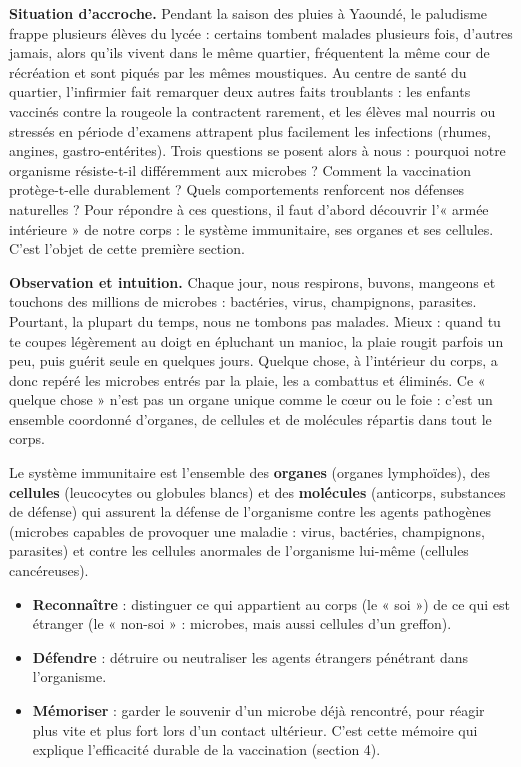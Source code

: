 \documentclass[11pt]{article}
\newcommand{\cle}[1]{{\popxbold\color{popdark}#1}}
\newcounter{popsec}
\newcounter{popsub}
\newcommand{\courssub}[1]{%
  \stepcounter{popsub}%
  \par\vspace{9pt}\noindent{\popxbold\fontsize{11.5}{13}\selectfont\color{popink}{\color{poporange}\thepopsec.\thepopsub}\hspace{6pt}#1}\par\nopagebreak\vspace{4pt}
}
\begin{document}
\textbf{Situation d'accroche.} Pendant la saison des pluies à Yaoundé, le paludisme frappe plusieurs élèves du lycée : certains tombent malades plusieurs fois, d'autres jamais, alors qu'ils vivent dans le même quartier, fréquentent la même cour de récréation et sont piqués par les mêmes moustiques. Au centre de santé du quartier, l'infirmier fait remarquer deux autres faits troublants : les enfants vaccinés contre la rougeole la contractent rarement, et les élèves mal nourris ou stressés en période d'examens attrapent plus facilement les infections (rhumes, angines, gastro-entérites). Trois questions se posent alors à nous : pourquoi notre organisme résiste-t-il différemment aux microbes ? Comment la vaccination protège-t-elle durablement ? Quels comportements renforcent nos défenses naturelles ? Pour répondre à ces questions, il faut d'abord découvrir l'« armée intérieure » de notre corps : le système immunitaire, ses organes et ses cellules. C'est l'objet de cette première section.

\courssub{Qu'est-ce que le système immunitaire ?}

\textbf{Observation et intuition.} Chaque jour, nous respirons, buvons, mangeons et touchons des millions de microbes : bactéries, virus, champignons, parasites. Pourtant, la plupart du temps, nous ne tombons pas malades. Mieux : quand tu te coupes légèrement au doigt en épluchant un manioc, la plaie rougit parfois un peu, puis guérit seule en quelques jours. Quelque chose, à l'intérieur du corps, a donc repéré les microbes entrés par la plaie, les a combattus et éliminés. Ce « quelque chose » n'est pas un organe unique comme le cœur ou le foie : c'est un ensemble coordonné d'organes, de cellules et de molécules répartis dans tout le corps.

\begin{definition}
Le \cle{système immunitaire} est l'ensemble des \textbf{organes} (organes lymphoïdes), des \textbf{cellules} (leucocytes ou globules blancs) et des \textbf{molécules} (anticorps, substances de défense) qui assurent la \cle{défense de l'organisme} contre les \cle{agents pathogènes} (microbes capables de provoquer une maladie : virus, bactéries, champignons, parasites) et contre les cellules anormales de l'organisme lui-même (cellules cancéreuses).
\end{definition}

\begin{aretenir}
\begin{itemize}
\item \textbf{Reconnaître} : distinguer ce qui appartient au corps (le « soi ») de ce qui est étranger (le « non-soi » : microbes, mais aussi cellules d'un greffon).
\item \textbf{Défendre} : détruire ou neutraliser les agents étrangers pénétrant dans l'organisme.
\item \textbf{Mémoriser} : garder le souvenir d'un microbe déjà rencontré, pour réagir plus vite et plus fort lors d'un contact ultérieur. C'est cette mémoire qui explique l'efficacité durable de la vaccination (section 4).
\end{itemize}
\end{aretenir}
\end{document}
